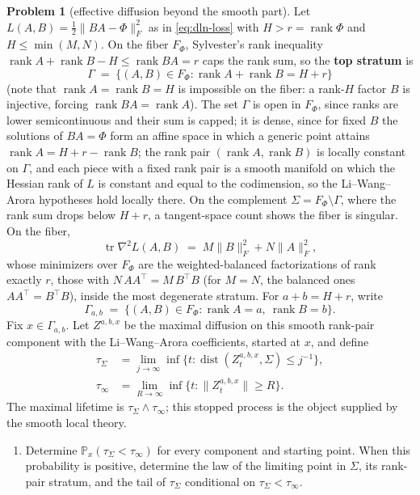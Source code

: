 \documentclass[11pt]{amsart}
\theoremstyle{plain}
\theoremstyle{definition}
\newtheorem{problem}[theorem]{Problem}
\newcommand{\dist}{\operatorname{dist}}
\newcommand{\rank}{\operatorname{rank}}
\newcommand{\tr}{\operatorname{tr}}
\begin{document}
\begin{problem}[effective diffusion beyond the smooth part]\label{prob:katzenberger}
Let $L(A, B) = \tfrac12 \| BA - \Phi \|_F^2$ as in \eqref{eq:dln-loss} with $H > r = \rank \Phi$ and $H \le \min(M, N)$. On the fiber $F_\Phi$, Sylvester's rank inequality $\rank A + \rank B - H \le \rank BA = r$ caps the rank sum, so the \textbf{top stratum} is
\[
   \Gamma \;=\; \{ (A,B) \in F_\Phi : \rank A + \rank B = H + r \}
\]
(note that $\rank A = \rank B = H$ is impossible on the fiber: a rank-$H$ factor $B$ is injective, forcing $\rank BA = \rank A$). The set $\Gamma$ is open in $F_\Phi$, since ranks are lower semicontinuous and their sum is capped; it is dense, since for fixed $B$ the solutions of $BA = \Phi$ form an affine space in which a generic point attains $\rank A = H + r - \rank B$; the rank pair $(\rank A, \rank B)$ is locally constant on $\Gamma$, and each piece with a fixed rank pair is a smooth manifold on which the Hessian rank of $L$ is constant and equal to the codimension, so the Li--Wang--Arora hypotheses hold locally there. On the complement $\Sigma = F_\Phi \setminus \Gamma$, where the rank sum drops below $H + r$, a tangent-space count shows the fiber is singular. On the fiber,
\[
   \tr \nabla^2 L(A, B) \;=\; M \| B \|_F^2 + N \| A \|_F^2 ,
\]
whose minimizers over $F_\Phi$ are the weighted-balanced factorizations of rank exactly $r$, those with $N \, A A^\top = M \, B^\top B$ (for $M = N$, the balanced ones $A A^\top = B^\top B$), inside the most degenerate stratum.
For $a+b=H+r$, write
\[
   \Gamma_{a,b}
   \;=\;
   \{(A,B)\in F_\Phi:\rank A=a,\ \rank B=b\}.
\]
Fix $x\in\Gamma_{a,b}$. Let $Z^{a,b,x}$ be the maximal diffusion on this smooth rank-pair component with the Li--Wang--Arora coefficients, started at $x$, and define
\[
   \begin{aligned}
   \tau_\Sigma
   &=
   \lim_{j\to\infty}\inf\{t:\dist(Z_t^{a,b,x},\Sigma)\le j^{-1}\},\\
   \tau_\infty
   &=
   \lim_{R\to\infty}\inf\{t:\|Z_t^{a,b,x}\|\ge R\}.
   \end{aligned}
\]
The maximal lifetime is $\tau_\Sigma\wedge\tau_\infty$; this stopped process is the object supplied by the smooth local theory.
\begin{enumerate}
\item[(a)] Determine $\mathbb{P}_x(\tau_\Sigma<\tau_\infty)$ for every component and starting point. When this probability is positive, determine the law of the limiting point in $\Sigma$, its rank-pair stratum, and the tail of $\tau_\Sigma$ conditional on $\tau_\Sigma<\tau_\infty$.

\end{enumerate}
\end{problem}
\end{document}
